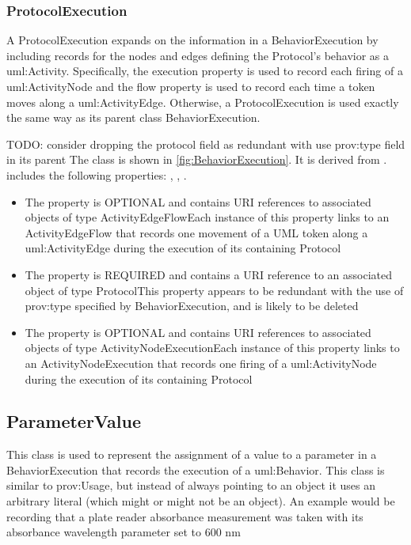 \subsubsection{ProtocolExecution}%
\label{sec:paml:ProtocolExecution}%
A ProtocolExecution expands on the information in a BehaviorExecution by including records for
        the nodes and edges defining the Protocol's behavior as a uml:Activity. Specifically, the execution property
        is used to record each firing of a uml:ActivityNode and the flow property is used to record each time a token
        moves along a uml:ActivityEdge.
        Otherwise, a ProtocolExecution is used exactly the same way as its parent class BehaviorExecution.

        TODO: consider dropping the protocol field as redundant with use prov:type field in its parent%
\linebreak%
\linebreak%
The  class is shown in \ref{fig:BehaviorExecution}. It is derived from .%
 includes the following properties: , , . %
\begin{itemize}%
\item%
The  property is OPTIONAL and contains URI references to associated objects of type ActivityEdgeFlowEach instance of this property links to an ActivityEdgeFlow that records one movement of a UML
        token along a uml:ActivityEdge during the execution of its containing Protocol%
\item%
The  property is REQUIRED and contains a URI reference to an associated object of type ProtocolThis property appears to be redundant with the use of prov:type specified by BehaviorExecution, and is likely to be deleted%
\item%
The  property is OPTIONAL and contains URI references to associated objects of type ActivityNodeExecutionEach instance of this property links to an ActivityNodeExecution that records one
        firing of a uml:ActivityNode during the execution of its containing Protocol%
\end{itemize}%
\subsection{ParameterValue}%
\label{sec:paml:ParameterValue}%
This class is used to represent the assignment of a value to a parameter in a BehaviorExecution
        that records the execution of a uml:Behavior. This class is similar to prov:Usage, but instead of always
        pointing to an object it uses an arbitrary literal (which might or might not be an object). An example would
        be recording that a plate reader absorbance measurement was taken with its absorbance wavelength parameter set
        to 600 nm%
\linebreak%
\linebreak%


